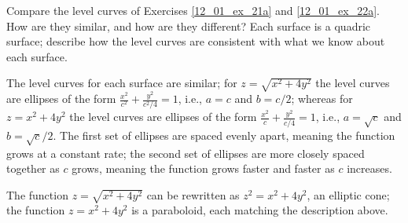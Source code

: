 {Compare the level curves of Exercises \ref{12_01_ex_21a} and \ref{12_01_ex_22a}. How are they similar, and how are they different? Each surface is a quadric surface; describe how the level curves are consistent with what we know about each surface.}
{The level curves for each surface are similar; for $z=\sqrt{x^2+4y^2}$ the level curves are ellipses of the form $\frac{x^2}{c^2}+\frac{y^2}{c^2/4}=1$, i.e., $a=c$ and $b=c/2$; whereas for $z=x^2+4y^2$ the level curves are ellipses of the form $\frac{x^2}{c}+\frac{y^2}{c/4}=1$, i.e., $a=\sqrt{c}$ and $b=\sqrt{c}/2$. The first set of ellipses are spaced evenly apart, meaning the function grows at a constant rate; the second set of ellipses are more closely spaced together as $c$ grows, meaning the function grows faster and faster as $c$ increases.

The function $z=\sqrt{x^2+4y^2}$ can be rewritten as $z^2=x^2+4y^2$, an elliptic cone; the function $z=x^2+4y^2$ is a paraboloid, each matching the description above.
}